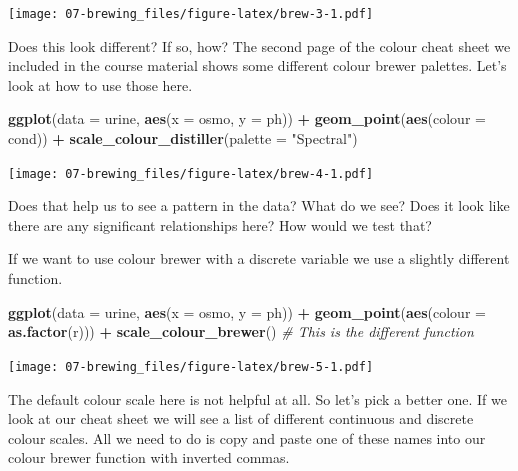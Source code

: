 \documentclass[
]{book}
\newenvironment{Shaded}{\begin{snugshade}}{\end{snugshade}}
\newcommand{\CommentTok}[1]{\textcolor[rgb]{0.56,0.35,0.01}{\textit{#1}}}
\newcommand{\DataTypeTok}[1]{\textcolor[rgb]{0.13,0.29,0.53}{#1}}
\newcommand{\KeywordTok}[1]{\textcolor[rgb]{0.13,0.29,0.53}{\textbf{#1}}}
\newcommand{\NormalTok}[1]{#1}
\newcommand{\OperatorTok}[1]{\textcolor[rgb]{0.81,0.36,0.00}{\textbf{#1}}}
\newcommand{\StringTok}[1]{\textcolor[rgb]{0.31,0.60,0.02}{#1}}
\begin{document}
\texttt{[image: 07-brewing\_files/figure-latex/brew-3-1.pdf]}

Does this look different? If so, how? The second page of the colour cheat sheet we included in the course material shows some different colour brewer palettes. Let's look at how to use those here.

\begin{Shaded}
\begin{Highlighting}[]
\KeywordTok{ggplot}\NormalTok{(}\DataTypeTok{data =}\NormalTok{ urine, }\KeywordTok{aes}\NormalTok{(}\DataTypeTok{x =}\NormalTok{ osmo, }\DataTypeTok{y =}\NormalTok{ ph)) }\OperatorTok{+}
\StringTok{  }\KeywordTok{geom\_point}\NormalTok{(}\KeywordTok{aes}\NormalTok{(}\DataTypeTok{colour =}\NormalTok{ cond)) }\OperatorTok{+}
\StringTok{  }\KeywordTok{scale\_colour\_distiller}\NormalTok{(}\DataTypeTok{palette =} \StringTok{"Spectral"}\NormalTok{)}
\end{Highlighting}
\end{Shaded}

\texttt{[image: 07-brewing\_files/figure-latex/brew-4-1.pdf]}

Does that help us to see a pattern in the data? What do we see? Does it look like there are any significant relationships here? How would we test that?

If we want to use colour brewer with a discrete variable we use a slightly different function.

\begin{Shaded}
\begin{Highlighting}[]
\KeywordTok{ggplot}\NormalTok{(}\DataTypeTok{data =}\NormalTok{ urine, }\KeywordTok{aes}\NormalTok{(}\DataTypeTok{x =}\NormalTok{ osmo, }\DataTypeTok{y =}\NormalTok{ ph)) }\OperatorTok{+}
\StringTok{  }\KeywordTok{geom\_point}\NormalTok{(}\KeywordTok{aes}\NormalTok{(}\DataTypeTok{colour =} \KeywordTok{as.factor}\NormalTok{(r))) }\OperatorTok{+}
\StringTok{  }\KeywordTok{scale\_colour\_brewer}\NormalTok{() }\CommentTok{\# This is the different function}
\end{Highlighting}
\end{Shaded}

\texttt{[image: 07-brewing\_files/figure-latex/brew-5-1.pdf]}

The default colour scale here is not helpful at all. So let's pick a better one. If we look at our cheat sheet we will see a list of different continuous and discrete colour scales. All we need to do is copy and paste one of these names into our colour brewer function with inverted commas.
\end{document}
